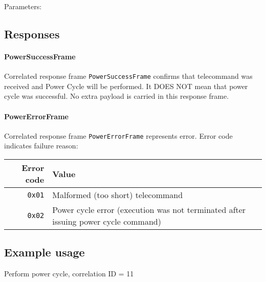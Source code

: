 Parameters: 

\begin{tcarglist}
\end{tcarglist}


\subsection{Responses}

\paragraph{PowerSuccessFrame}
Correlated response frame \texttt{PowerSuccessFrame} confirms that telecommand was received and Power Cycle will be performed. It DOES NOT mean that power cycle was successful. No extra payload is carried in this response frame.

\paragraph{PowerErrorFrame}
Correlated response frame \texttt{PowerErrorFrame} represents error. Error code indicates failure reason:

\begin{tabular}{r | l}
	Error code & Value \\
	\hline
	\texttt{0x01} & Malformed (too short) telecommand \\
	\texttt{0x02} & Power cycle error (\obc execution was not terminated after issuing power cycle command) \\
	
\end{tabular}

\subsection{Example usage}
Perform power cycle, correlation ID = 11


